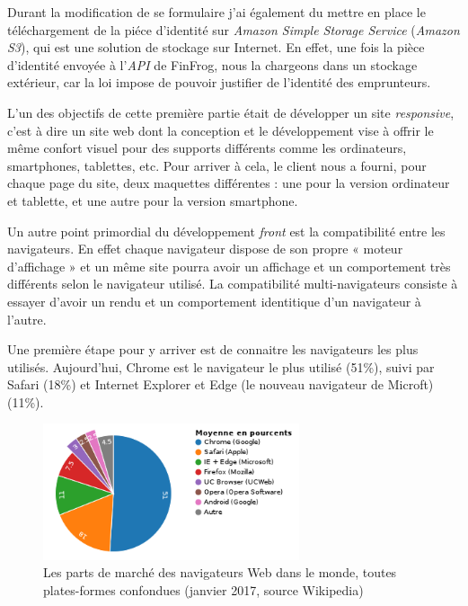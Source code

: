 \bigskip

Durant la modification de se formulaire j'ai également du mettre en
place le téléchargement de la piéce d'identité sur \emph{Amazon Simple
Storage Service} (\emph{Amazon S3}), qui est une solution de stockage
sur Internet. En effet, une fois la pièce d'identité envoyée à
l'\emph{API} de FinFrog, nous la chargeons dans un stockage extérieur,
car la loi impose de pouvoir justifier de l'identité des emprunteurs.

\bigskip

L'un des objectifs de cette première partie était de développer un site
\emph{responsive}, c'est à dire un site web dont la conception et le
développement vise à offrir le même confort visuel pour des supports
différents comme les ordinateurs, smartphones, tablettes, etc. Pour
arriver à cela, le client nous a fourni, pour chaque page du site, deux
maquettes différentes : une pour la version ordinateur et tablette, et
une autre pour la version smartphone.

\bigskip

Un autre point primordial du développement \emph{front} est la
compatibilité entre les navigateurs. En effet chaque navigateur dispose
de son propre « moteur d'affichage » et un même site pourra avoir un
affichage et un comportement très différents selon le navigateur
utilisé. La compatibilité multi-navigateurs consiste à essayer d'avoir
un rendu et un comportement identitique d'un navigateur à l'autre.

\bigskip

Une première étape pour y arriver est de connaitre les navigateurs les
plus utilisés. Aujourd'hui, Chrome est le navigateur le plus utilisé
(51\%), suivi par Safari (18\%) et Internet Explorer et Edge (le nouveau
navigateur de Microft) (11\%).

\begin{figure}[h]
  \centering
  \includegraphics[height=4cm]{figures/browsers.png}
  \caption{Les parts de marché des navigateurs Web dans le monde, toutes plates-formes confondues (janvier 2017, source Wikipedia)}
\end{figure}

